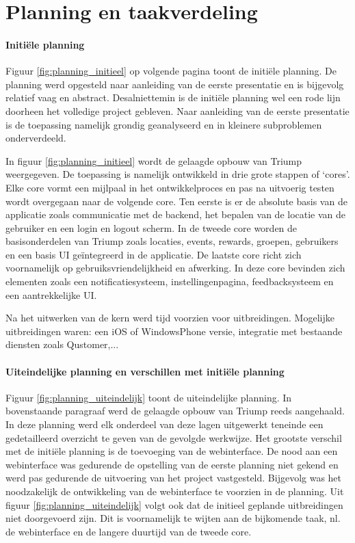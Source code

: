 
\chapter{Planning en taakverdeling}


\subsubsection{Initiële planning}

Figuur \ref{fig:planning_initieel} op volgende pagina toont de initiële planning. De planning werd opgesteld naar aanleiding van de eerste presentatie en is bijgevolg relatief vaag en abstract. Desalniettemin is de initiële planning wel een rode lijn doorheen het volledige project gebleven. Naar aanleiding van de eerste presentatie is de toepassing namelijk grondig geanalyseerd en in kleinere subproblemen onderverdeeld.

In figuur \ref{fig:planning_initieel} wordt de gelaagde opbouw van Triump weergegeven. De toepassing is namelijk ontwikkeld in drie grote stappen of `cores'. Elke core vormt een mijlpaal in het ontwikkelproces en pas na uitvoerig testen wordt overgegaan naar de volgende core. 
Ten eerste is er de absolute basis van de applicatie zoals communicatie met de backend, het bepalen van de locatie van de gebruiker en een login en logout scherm. In de tweede core worden de basisonderdelen van Triump zoals locaties, events, rewards, groepen, gebruikers en een basis UI geïntegreerd in de applicatie. De laatste core richt zich voornamelijk op gebruiksvriendelijkheid en afwerking. In deze core bevinden zich elementen zoals een notificatiesysteem, instellingenpagina, feedbacksysteem en een aantrekkelijke UI.

Na het uitwerken van de kern werd tijd voorzien voor uitbreidingen. Mogelijke uitbreidingen waren: een iOS of WindowsPhone versie, integratie met bestaande diensten zoals Qustomer,... 

\subsubsection{Uiteindelijke planning en verschillen met initiële planning}

Figuur \ref{fig:planning_uiteindelijk} toont de uiteindelijke planning. In bovenstaande paragraaf werd de gelaagde opbouw van Triump reeds aangehaald. In deze planning werd elk onderdeel van deze lagen uitgewerkt teneinde een gedetailleerd overzicht te geven van de gevolgde werkwijze. Het grootste verschil met de initiële planning is de toevoeging van de webinterface. De nood aan een webinterface was gedurende de opstelling van de eerste planning niet gekend en werd pas gedurende de uitvoering van het project vastgesteld. Bijgevolg was het noodzakelijk de ontwikkeling van de webinterface te voorzien in de planning. 
Uit figuur \ref{fig:planning_uiteindelijk} volgt ook dat de initieel geplande uitbreidingen niet doorgevoerd zijn. Dit is voornamelijk te wijten aan de bijkomende taak, nl. de webinterface en de langere duurtijd van de tweede core.

